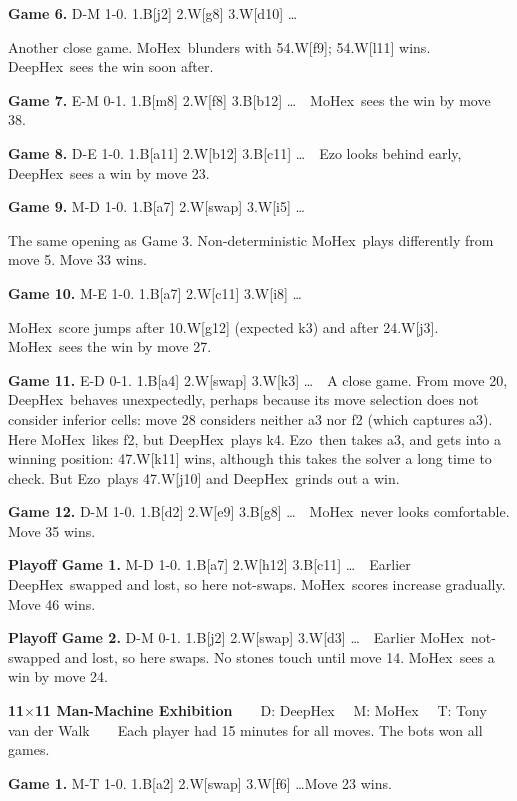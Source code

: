 \documentclass{icga}
\def\Dx{\mbox{\sc DeepHex}}
\def\Eo{\mbox{\sc Ezo}}
\def\Mx{\mbox{\sc MoHex}}
\def\TV{\mbox{\sc TV}} %
\begin{document}
{\bf Game 6.}
{\sc D-M 1-0.}
1.B[j2] 2.W[g8] 3.W[d10] \ldots \ \ 

\hfill Another close game.
\Mx\ blunders with 54.W[f9]; 54.W[l11] wins.
\Dx\ sees the win soon after.

{\bf Game 7.}
{\sc E-M 0-1.}
1.B[m8] 2.W[f8] 3.B[b12] \ldots \ \ 
\hfill\Mx\ sees the win by move 38.

{\bf Game 8.}
{\sc D-E 1-0.}
1.B[a11] 2.W[b12] 3.B[c11] \ldots \ \ 
\Eo{} looks behind early, \Dx\ sees a win by move 23.

{\bf Game 9.}
{\sc M-D 1-0.}
1.B[a7] 2.W[swap] 3.W[i5] \ldots \ \ 

\hfill The same opening as Game 3.
Non-deterministic \Mx\ plays differently from move 5.
Move 33 wins.

{\bf Game 10.}
{\sc M-E 1-0.}
1.B[a7] 2.W[c11] 3.W[i8] \ldots \ \ 

\hfill\Mx{}ore jumps after 10.W[g12] (expected k3)
and after 24.W[j3]. \Mx\ sees the win by move 27.

{\bf Game 11.}
{\sc E-D 0-1.}
1.B[a4] 2.W[swap] 3.W[k3] \ldots \ \ 
A close game. From move 20, \Dx\ behaves unexpectedly,
perhaps because its move selection does not consider inferior cells:
move 28 considers neither a3 nor f2 (which captures a3).
Here \Mx\ likes f2, but \Dx\ plays k4.
\Eo\ then takes a3, and gets into a winning position:
47.W[k11] wins, although this takes the solver a long time to check.
But \Eo\ plays 47.W[j10] and \Dx\ grinds out a win.

{\bf Game 12.}
{\sc D-M 1-0.}
1.B[d2] 2.W[e9] 3.B[g8] \ldots \ \ 
\hfill\Mx\ never looks comfortable. Move 35 wins.

{\bf Playoff Game 1.}
{\sc M-D 1-0.}
1.B[a7] 2.W[h12] 3.B[c11] \ldots \ \ 
Earlier \Dx\ swapped and lost, so here not-swaps.
\Mx{}ores increase gradually. Move 46 wins.

{\bf Playoff Game 2.}
{\sc D-M 0-1.}
1.B[j2] 2.W[swap] 3.W[d3] \ldots \ \ 
Earlier \Mx\ not-swapped and lost, so here swaps. 
No stones touch until move 14. \Mx\ sees a win by move 24.

{\large\bf 11$\times$11 Man-Machine Exhibition} 
~ ~ {\sc D: \Dx\ ~ M: \Mx\ ~ T: Tony van der Walk} ~ ~ 
Each player had 15 minutes for all moves. The bots won all games.

{\bf Game 1.}
{\sc M-T 1-0.}
1.B[a2] 2.W[swap] 3.W[f6] \ldots \hfill Move 23 wins.
\end{document}
